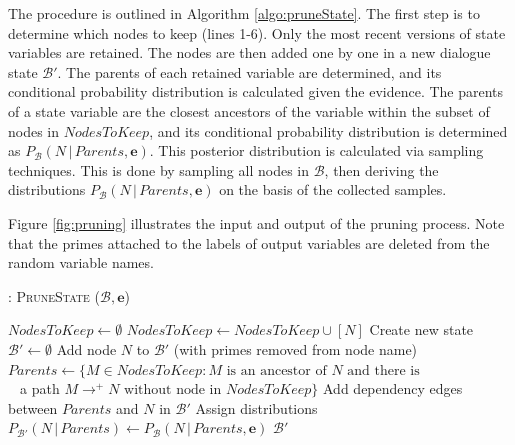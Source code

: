 The procedure is outlined in Algorithm \ref{algo:pruneState}. The first step is to determine which nodes to keep (lines 1-6).  Only the most recent versions of state variables are retained. 
The nodes are then added one by one in a new dialogue state $\mathcal{B}'$.  The parents of each retained variable are determined, and its conditional probability distribution is calculated given the evidence.  The parents of a state variable are the closest ancestors of the variable within the subset of nodes in $\mathit{NodesToKeep}$, and its conditional probability distribution is determined as $P_{\mathcal{B}}(N \, | \, \mathit{Parents}, \mathbf{e})$.  This posterior distribution is calculated via sampling techniques. This is done by sampling all nodes in $\mathcal{B}$, then deriving the distributions $P_{\mathcal{B}}(N \, | \, \mathit{Parents}, \mathbf{e})$ on the basis of the collected samples.  

Figure \ref{fig:pruning} illustrates the input and output of the pruning process. Note that the primes attached to the labels of output variables are deleted from the random variable names.

\begin{algorithm}[h]
\caption{: \textsc{PruneState} ($\mathcal{B}, \mathbf{e}$)}
\begin{algorithmic}[1] \vspace{1mm}
\STATE $\mathit{NodesToKeep} \leftarrow \emptyset$
\STATE $\mathit{NodesToKeep} \leftarrow \mathit{NodesToKeep} \cup [N]$ 
\ENDIF
\ENDFOR
\STATE Create new state $\mathcal{B}' \leftarrow \emptyset$
\STATE Add node $N$ to $\mathcal{B}'$ (with primes removed from node name)
\STATE $\mathit{Parents} \leftarrow \{M \in \mathit{NodesToKeep} : M \text{ is an ancestor of } N \text{ and there is } $ \\ $\phantom{a}$  \; \; \; \; \; \; \; \; \;  a path $M \rightarrow^+  N \text{ without node in } \mathit{NodesToKeep} \}$ 
\STATE Add dependency edges between $\mathit{Parents}$ and $N$ in $\mathcal{B}'$
\STATE Assign distributions $P_{\mathcal{B}'}(N \, | \, \mathit{Parents}) \leftarrow P_{\mathcal{B}}(N \, | \, \mathit{Parents}, \mathbf{e})$
\ENDFOR
\RETURN $\mathcal{B}'$
\end{algorithmic}
\label{algo:pruneState}
\end{algorithm}


